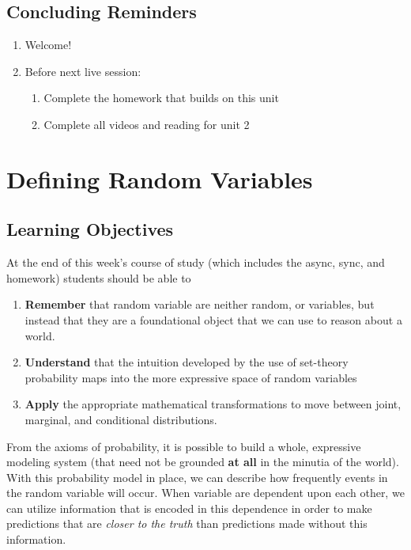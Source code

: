 \documentclass[
]{book}
\providecommand{\tightlist}{%
  \setlength{\itemsep}{0pt}\setlength{\parskip}{0pt}}
\theoremstyle{definition}
\theoremstyle{definition}
\theoremstyle{definition}
\theoremstyle{definition}
\theoremstyle{remark}
\begin{document}
\hypertarget{concluding-reminders}{%
\section{Concluding Reminders}\label{concluding-reminders}}

\begin{enumerate}
\def\labelenumi{\arabic{enumi}.}
\tightlist
\item
  Welcome!
\item
  Before next live session:

  \begin{enumerate}
  \def\labelenumii{\arabic{enumii}.}
  \tightlist
  \item
    Complete the homework that builds on this unit
  \item
    Complete all videos and reading for unit 2
  \end{enumerate}
\end{enumerate}

\hypertarget{defining-random-variables}{%
\chapter{Defining Random Variables}\label{defining-random-variables}}

\hypertarget{learning-objectives-1}{%
\section{Learning Objectives}\label{learning-objectives-1}}

At the end of this week's course of study (which includes the async, sync, and homework) students should be able to

\begin{enumerate}
\def\labelenumi{\arabic{enumi}.}
\tightlist
\item
  \textbf{Remember} that random variable are neither random, or variables, but instead that they are a foundational object that we can use to reason about a world.
\item
  \textbf{Understand} that the intuition developed by the use of set-theory probability maps into the more expressive space of random variables
\item
  \textbf{Apply} the appropriate mathematical transformations to move between joint, marginal, and conditional distributions.
\end{enumerate}

From the axioms of probability, it is possible to build a whole, expressive modeling system (that need not be grounded \textbf{at all} in the minutia of the world). With this probability model in place, we can describe how frequently events in the random variable will occur. When variable are dependent upon each other, we can utilize information that is encoded in this dependence in order to make predictions that are \emph{closer to the truth} than predictions made without this information.
\end{document}
